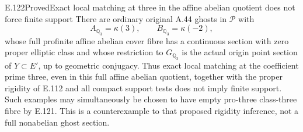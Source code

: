 \begin{result}{E.122}{Proved}{Exact local matching at three in the affine abelian quotient does not force finite support}
There are ordinary original A.44 ghosts in $\mathscr P$ with
\[
 A_{\mathbb Q_3}=\kappa(3),\qquad
 B_{\mathbb Q_3}=\kappa(-2),
\]
whose full profinite affine abelian cover fibre has a continuous
section with zero proper elliptic class and whose restriction to
$G_{\mathbb Q_3}$ is the actual origin point section of
$Y\subset E'$, up to geometric conjugacy. Thus exact local matching
at the coefficient prime three, even in this full affine abelian
quotient, together with the proper rigidity of E.112 and all compact
support tests does not imply finite support.
Such examples may simultaneously be chosen to have empty pro-three
class-three fibre by E.121. This is a counterexample to that proposed
rigidity inference, not a full nonabelian ghost section.
\end{result}

